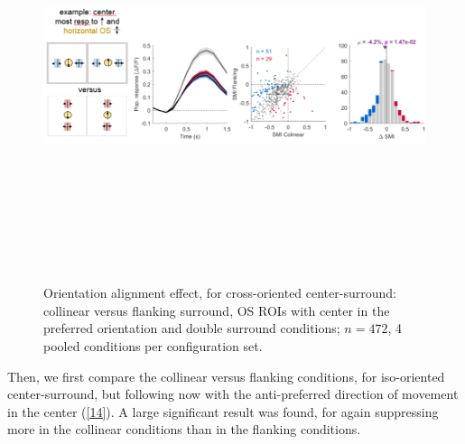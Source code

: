 \begin{figure}[H] \centering \includegraphics[width=12cm,height=12cm,keepaspectratio]{Figures/7.Results/finalPopulation/sel/diagrams/13.png} 
\caption{Orientation alignment effect, for cross-oriented center-surround: collinear versus flanking surround, OS ROIs with center in the preferred orientation and double surround conditions;  $n=472$, 4 pooled conditions per configuration set.} \label{13} 
\end{figure}

Then, we first compare the collinear versus flanking conditions, for iso-oriented center-surround, but following now with the anti-preferred direction of movement in the center (\ref{14}). A large significant result was found, for again suppressing more in the collinear conditions than in the flanking conditions.

